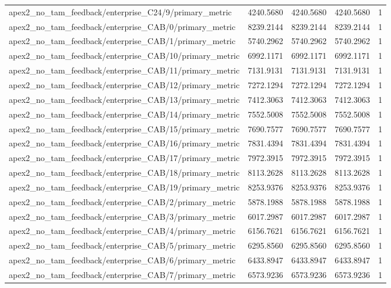 \begin{table}[h]
\begin{tabular}{lrrrr}
apex2_no_tam_feedback/enterprise_C24/9/primary_metric & 4240.5680 & 4240.5680 & 4240.5680 & 1 \\
apex2_no_tam_feedback/enterprise_CAB/0/primary_metric & 8239.2144 & 8239.2144 & 8239.2144 & 1 \\
apex2_no_tam_feedback/enterprise_CAB/1/primary_metric & 5740.2962 & 5740.2962 & 5740.2962 & 1 \\
apex2_no_tam_feedback/enterprise_CAB/10/primary_metric & 6992.1171 & 6992.1171 & 6992.1171 & 1 \\
apex2_no_tam_feedback/enterprise_CAB/11/primary_metric & 7131.9131 & 7131.9131 & 7131.9131 & 1 \\
apex2_no_tam_feedback/enterprise_CAB/12/primary_metric & 7272.1294 & 7272.1294 & 7272.1294 & 1 \\
apex2_no_tam_feedback/enterprise_CAB/13/primary_metric & 7412.3063 & 7412.3063 & 7412.3063 & 1 \\
apex2_no_tam_feedback/enterprise_CAB/14/primary_metric & 7552.5008 & 7552.5008 & 7552.5008 & 1 \\
apex2_no_tam_feedback/enterprise_CAB/15/primary_metric & 7690.7577 & 7690.7577 & 7690.7577 & 1 \\
apex2_no_tam_feedback/enterprise_CAB/16/primary_metric & 7831.4394 & 7831.4394 & 7831.4394 & 1 \\
apex2_no_tam_feedback/enterprise_CAB/17/primary_metric & 7972.3915 & 7972.3915 & 7972.3915 & 1 \\
apex2_no_tam_feedback/enterprise_CAB/18/primary_metric & 8113.2628 & 8113.2628 & 8113.2628 & 1 \\
apex2_no_tam_feedback/enterprise_CAB/19/primary_metric & 8253.9376 & 8253.9376 & 8253.9376 & 1 \\
apex2_no_tam_feedback/enterprise_CAB/2/primary_metric & 5878.1988 & 5878.1988 & 5878.1988 & 1 \\
apex2_no_tam_feedback/enterprise_CAB/3/primary_metric & 6017.2987 & 6017.2987 & 6017.2987 & 1 \\
apex2_no_tam_feedback/enterprise_CAB/4/primary_metric & 6156.7621 & 6156.7621 & 6156.7621 & 1 \\
apex2_no_tam_feedback/enterprise_CAB/5/primary_metric & 6295.8560 & 6295.8560 & 6295.8560 & 1 \\
apex2_no_tam_feedback/enterprise_CAB/6/primary_metric & 6433.8947 & 6433.8947 & 6433.8947 & 1 \\
apex2_no_tam_feedback/enterprise_CAB/7/primary_metric & 6573.9236 & 6573.9236 & 6573.9236 & 1 \\

\end{tabular}
\end{table}
